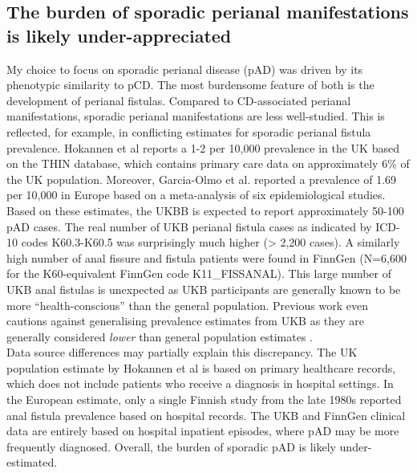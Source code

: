 \subsection{The burden of sporadic perianal manifestations is likely under-appreciated}
My choice to focus on sporadic perianal disease (pAD) was driven by its phenotypic similarity to pCD. The most burdensome feature of both is the development of perianal fistulas. Compared to CD-associated perianal manifestations, sporadic perianal manifestations are less well-studied. This is reflected, for example, in conflicting estimates for sporadic perianal fistula prevalence. Hokannen et al \cite{Hokkanen2019-ov} reports a 1-2 per 10,000 prevalence in the UK based on the THIN database, which contains primary care data on approximately 6\% of the UK population. Moreover, Garcia-Olmo et al. \cite{Garcia-Olmo2019-ql} reported a prevalence of 1.69 per 10,000 in Europe based on a meta-analysis of six epidemiological studies. Based on these estimates, the UKBB is expected to report approximately 50-100 pAD cases. The real number of UKB perianal fistula cases as indicated by ICD-10 codes K60.3-K60.5 was surprisingly much higher (> 2,200 cases). A similarly high number of anal fissure and fistula patients were found in FinnGen (N=6,600 for the K60-equivalent FinnGen code K11\_FISSANAL). This large number of UKB anal fistulas is unexpected as UKB participants are generally known to be more “health-conscious” than the general population. Previous work even cautions against generalising prevalence estimates from UKB as they are generally considered \textit{lower} than general population estimates \cite{Fry2017-ug}. \\

Data source differences may partially explain this discrepancy. The UK population estimate by Hokannen et al is based on primary healthcare records, which does not include patients who receive a diagnosis in hospital settings. In the European estimate, only a single Finnish study from the late 1980s reported anal fistula prevalence based on hospital records. The UKB and FinnGen clinical data are entirely based on hospital inpatient episodes, where pAD may be more frequently diagnosed. Overall, the burden of sporadic pAD is likely under-estimated. \\

